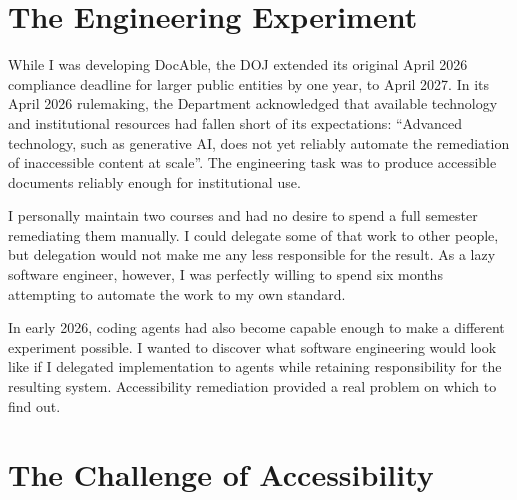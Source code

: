 \section{The Engineering Experiment}\label{heading:the-engineering-experiment}


While I was developing DocAble, the DOJ extended its original April 2026 compliance deadline for larger public entities by one year, to April 2027. In its April 2026 rulemaking, the Department acknowledged that available technology and institutional resources had fallen short of its expectations: ``Advanced technology, such as generative AI, does not yet reliably automate the remediation of inaccessible content at scale''\citep{doj2026extension}. The engineering task was to produce accessible documents reliably enough for institutional use.

I personally maintain two courses and had no desire to spend a full semester remediating them manually. I could delegate some of that work to other people, but delegation would not make me any less responsible for the result. As a lazy software engineer, however, I was perfectly willing to spend six months attempting to automate the work to my own standard.


In early 2026, coding agents had also become capable enough to make a different experiment possible. I wanted to discover what software engineering would look like if I delegated implementation to agents while retaining responsibility for the resulting system. Accessibility remediation provided a real problem on which to find out.

\section{The Challenge of Accessibility}\label{heading:the-challenge-of-accessibility}



